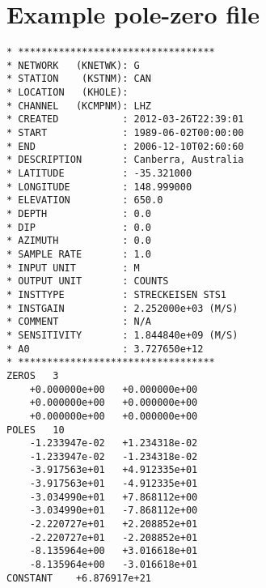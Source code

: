 \documentclass[11pt,titlepage,fleqn]{article}
\begin{document}

\iffalse
\section{Deconvolve instrument response for a seismogram}

FUTURE PART OF THE LAB (see also \verb+lab_sumatra.pdf+):
%
\begin{verbatim}
otime = 2004-12-26 00:58:50 = 732307.040856 [matlab days]
station CAN.G
duration = 10 days
start time: t1 = otime - duration - 1
end time: t2 = t1 + duration
channels: LHZ, LHE, LHN

Deconvolve instrument response on all three components.
Plot the amplitude spectrum over 0.2--1.0 mHz to show the gravest mode peaks.
Show what the main arrival looks like at bandpass 50-500s with and without decon.
Rotate to R and T to isolate SH waves.
[Having the previous 10 days allows for the noise analysis in hw_sumatraA.pdf]
\end{verbatim}
\fi



\pagebreak

\appendix

\section{Example pole-zero file}
\label{sec:pz}

\small
\begin{spacing}{1.0}
\begin{verbatim}
* **********************************
* NETWORK   (KNETWK): G
* STATION    (KSTNM): CAN
* LOCATION   (KHOLE): 
* CHANNEL   (KCMPNM): LHZ
* CREATED           : 2012-03-26T22:39:01
* START             : 1989-06-02T00:00:00
* END               : 2006-12-10T02:60:60
* DESCRIPTION       : Canberra, Australia
* LATITUDE          : -35.321000
* LONGITUDE         : 148.999000 
* ELEVATION         : 650.0  
* DEPTH             : 0.0  
* DIP               : 0.0  
* AZIMUTH           : 0.0  
* SAMPLE RATE       : 1.0
* INPUT UNIT        : M
* OUTPUT UNIT       : COUNTS
* INSTTYPE          : STRECKEISEN STS1
* INSTGAIN          : 2.252000e+03 (M/S)
* COMMENT           : N/A
* SENSITIVITY       : 1.844840e+09 (M/S)
* A0                : 3.727650e+12
* **********************************
ZEROS	3
	+0.000000e+00	+0.000000e+00
	+0.000000e+00	+0.000000e+00
	+0.000000e+00	+0.000000e+00
POLES	10
	-1.233947e-02	+1.234318e-02
	-1.233947e-02	-1.234318e-02
	-3.917563e+01	+4.912335e+01
	-3.917563e+01	-4.912335e+01
	-3.034990e+01	+7.868112e+00
	-3.034990e+01	-7.868112e+00
	-2.220727e+01	+2.208852e+01
	-2.220727e+01	-2.208852e+01
	-8.135964e+00	+3.016618e+01
	-8.135964e+00	-3.016618e+01
CONSTANT	+6.876917e+21
\end{verbatim}
\end{spacing}
\normalsize
\end{document}
